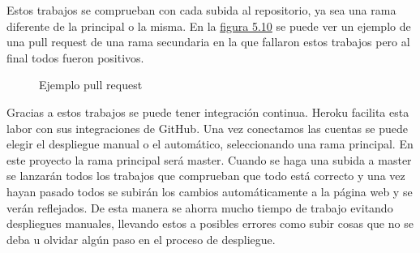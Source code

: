 Estos trabajos se comprueban con cada subida al repositorio, ya sea una rama
diferente de la principal o la misma. En la \hyperref[fig:Ejemplo pull request]{figura 5.10}
se puede ver un ejemplo de una pull request de una rama secundaria en la que
fallaron estos trabajos pero al final todos fueron positivos.

\begin{figure}[htb]
  \centering
  \scalebox{.8}{\texttt{[image: CI]}}
  \caption[Ejemplo pull request]{Ejemplo pull request}
  \label{fig:Ejemplo pull request}
\end{figure}

Gracias a estos trabajos se puede tener integración continua. Heroku facilita
esta labor con sus integraciones de GitHub. Una vez conectamos las cuentas se
puede elegir el despliegue manual o el automático, seleccionando una rama principal.
En este proyecto la rama principal será master. Cuando se haga una subida a master
se lanzarán todos los trabajos que comprueban que todo está correcto y una vez hayan
pasado todos se subirán los cambios automáticamente a la página web y se verán reflejados.
De esta manera se ahorra mucho tiempo de trabajo evitando despliegues manuales, llevando estos
a posibles errores como subir cosas que no se deba u olvidar algún paso en el proceso
de despliegue.
